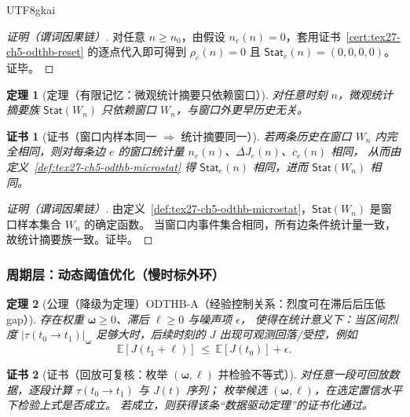 \documentclass[12pt]{article}
\newtheorem{theorem}{定理}[section]
\newtheorem{Certificate}{证书}[section]
\begin{document}
\begin{CJK*}{UTF8}{gkai}
\begin{proof}[证明（谓词因果链）]
对任意 $n\ge n_0$，由假设 $n_e(n)=0$，套用证书~\ref{cert:tex27-ch5-odthb-reset} 的逐点代入即可得到
$\rho_e(n)=0$ 且 $\mathsf{Stat}_e(n)=(0,0,0,0)$。证毕。
\end{proof}

\begin{theorem}[定理（有限记忆：微观统计摘要只依赖窗口）]
\label{thm:tex27-ch5-odthb-finite-memory}
对任意时刻 $n$，微观统计摘要族 $\mathsf{Stat}(W_n)$ 只依赖窗口 $W_n$，与窗口外更早历史无关。
\end{theorem}

\begin{Certificate}[证书（窗口内样本同一 $\Rightarrow$ 统计摘要同一）]
\label{cert:tex27-ch5-odthb-finite-memory}
若两条历史在窗口 $W_n$ 内完全相同，则对每条边 $e$ 的窗口统计量 $n_e(n)$、$\overline{\Delta J}_e(n)$、$\overline{c}_e(n)$ 相同，
从而由定义~\ref{def:tex27-ch5-odthb-microstat} 得 $\mathsf{Stat}_e(n)$ 相同，进而 $\mathsf{Stat}(W_n)$ 相同。
\end{Certificate}

\begin{proof}[证明（谓词因果链）]
由定义~\ref{def:tex27-ch5-odthb-microstat}，$\mathsf{Stat}(W_n)$ 是窗口样本集合 $W_n$ 的确定函数。
当窗口内事件集合相同，所有边条件统计量一致，故统计摘要族一致。证毕。
\end{proof}

\subsubsection{周期层：动态阈值优化（慢时标外环）}
\label{subsubsec:tex27-ch5-odthb-slow-threshold}

\begin{theorem}[公理（降级为定理）ODTHB-A（经验控制关系：烈度可在滞后后压低 gap）]
\label{thm:tex27-ch5-odthb-empirical}
存在权重 $\boldsymbol{\omega}\ge 0$、滞后 $\ell\ge 0$ 与噪声项 $\epsilon$，
使得在统计意义下：当区间烈度 $|\tau(t_0\to t_1)|_{\boldsymbol{\omega}}$ 足够大时，后续时刻的 $J$ 出现可观测回落/受控，例如
\[
  \mathbb{E}[J(t_1+\ell)]\ \le\ \mathbb{E}[J(t_0)] + \epsilon.
\]
\end{theorem}

\begin{Certificate}[证书（回放可复核：枚举 $(\boldsymbol{\omega},\ell)$ 并检验不等式）]
\label{cert:tex27-ch5-odthb-empirical}
对任意一段可回放数据，逐段计算 $\tau(t_0\to t_1)$ 与 $J(t)$ 序列；
枚举候选 $(\boldsymbol{\omega},\ell)$，在选定置信水平下检验上式是否成立。
若成立，则获得该条“数据驱动定理”的证书化通过。
\end{Certificate}


\end{CJK*}
\end{document}
